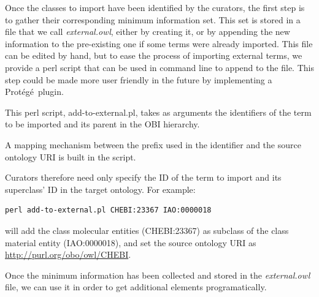 \documentclass[a4paper,10pt,twocolumn]{article}
\newcommand{\protege}{Prot\'{e}g\'{e}}
\begin{document}
Once the classes to import have been identified by the curators, the first step is to gather their corresponding minimum information set.
This set is stored in a file that we call \emph{external.owl}, either by creating it, or by appending the new information to the pre-existing one if some terms were already imported.
This file can be edited by hand, but to ease the process of importing external terms, we provide a perl script that can be used in command line to append to the file. This step could be made more user friendly in the future by implementing a \protege\ plugin.

This perl script, add-to-external.pl, takes as arguments the identifiers of the term to be imported and its parent in the OBI hierarchy.


A mapping mechanism between the prefix used in the identifier and the source ontology URI is built in the script.


Curators therefore need only specify the ID of the term to import and its superclass' ID in the target ontology.
For example:


\begin{footnotesize}
\begin{verbatim}
perl add-to-external.pl CHEBI:23367 IAO:0000018
\end{verbatim}
\end{footnotesize}
will add the class molecular entities (CHEBI:23367) as subclass of the class material entity (IAO:0000018), and set the source ontology URI as \url{http://purl.org/obo/owl/CHEBI}.

Once the minimum information has been collected  and stored in the \emph{external.owl} file, we can use it in order to get additional elements programatically.
\end{document}
